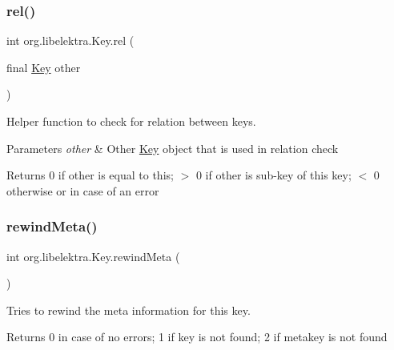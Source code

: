 \subsubsection{\texorpdfstring{rel()}{rel()}}
{\footnotesize\ttfamily int org.\+libelektra.\+Key.\+rel (\begin{DoxyParamCaption}\item[{final \hyperlink{classorg_1_1libelektra_1_1Key}{Key}}]{other }\end{DoxyParamCaption})\hspace{0.3cm}{\ttfamily [inline]}}



Helper function to check for relation between keys. 


\begin{DoxyParams}{Parameters}
{\em other} & Other \hyperlink{classorg_1_1libelektra_1_1Key}{Key} object that is used in relation check \\
\hline
\end{DoxyParams}
\begin{DoxyReturn}{Returns}
0 if other is equal to this; $>$ 0 if other is sub-\/key of this key; $<$ 0 otherwise or in case of an error 
\end{DoxyReturn}
\mbox{\label{classorg_1_1libelektra_1_1Key_aea5c4a3a24237dca57e55beca85db0be}} 
\subsubsection{\texorpdfstring{rewind\+Meta()}{rewindMeta()}}
{\footnotesize\ttfamily int org.\+libelektra.\+Key.\+rewind\+Meta (\begin{DoxyParamCaption}{ }\end{DoxyParamCaption})\hspace{0.3cm}{\ttfamily [inline]}}



Tries to rewind the meta information for this key. 

\begin{DoxyReturn}{Returns}
0 in case of no errors; 1 if key is not found; 2 if metakey is not found 
\end{DoxyReturn}
\mbox{\label{classorg_1_1libelektra_1_1Key_a5226472bedc6a02dee826ee3facdb25f}} 

